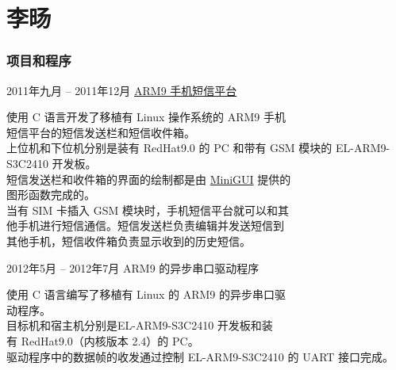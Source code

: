 \documentclass{tccv}
\begin{document}
\part{\VeraSansYuanTi 李旸}

\section{\ShiShangZhongHeiJianTi 项目和程序}

\begin{eventlist}


\item{\ShiShangZhongHeiJianTi 2011年九月 -- 2011年12月}
  {}
  {\href{https://github.com/YoungLeeNENU/MessagePlatform}{\VeraSansYuanTi ARM9 手机短信平台}}

  \HiraginoSansGB
  使用 C 语言开发了移植有 Linux 操作系统的 ARM9 手机 \\
  短信平台的短信发送栏和短信收件箱。\\
  上位机和下位机分别是装有 RedHat9.0 的 PC 和带有 GSM 模块的 EL-ARM9-S3C2410 开发板。\\
  短信发送栏和收件箱的界面的绘制都是由 \href{http://www.minigui.org/en/}{MiniGUI} 提供的 \\
  图形函数完成的。\\
  当有 SIM 卡插入 GSM 模块时，手机短信平台就可以和其 \\
  他手机进行短信通信。短信发送栏负责编辑并发送短信到 \\
  其他手机，短信收件箱负责显示收到的历史短信。
  

\item{\ShiShangZhongHeiJianTi 2012年5月 -- 2012年7月}
  {}
  {\VeraSansYuanTi ARM9 的异步串口驱动程序}
  
  \HiraginoSansGB
  使用 C 语言编写了移植有 Linux 的 ARM9 的异步串口驱 \\
  动程序。\\
  目标机和宿主机分别是EL-ARM9-S3C2410 开发板和装 \\
  有 RedHat9.0（内核版本 2.4）的 PC。\\
  驱动程序中的数据帧的收发通过控制 EL-ARM9-S3C2410 的 UART 接口完成。
  




\end{eventlist}
\end{document}
